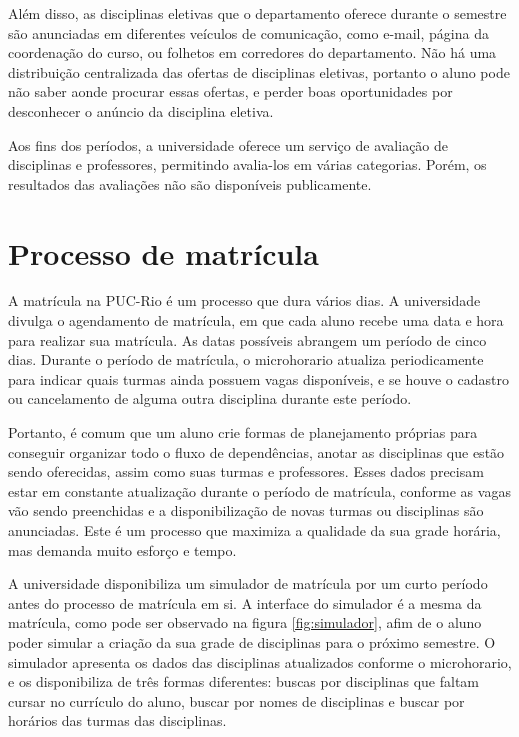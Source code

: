 Além disso, as disciplinas eletivas que o departamento oferece durante o semestre são anunciadas em diferentes veículos de comunicação, como e-mail, página da coordenação do curso, ou folhetos em corredores do departamento. Não há uma distribuição centralizada das ofertas de disciplinas eletivas, portanto o aluno pode não saber aonde procurar essas ofertas, e perder boas oportunidades por desconhecer o anúncio da disciplina eletiva.

Aos fins dos períodos, a universidade oferece um serviço de avaliação de disciplinas e professores, permitindo avalia-los em várias categorias. Porém, os resultados das avaliações não são disponíveis publicamente.

\section{Processo de matrícula}

A matrícula na PUC-Rio é um processo que dura vários dias. A universidade divulga o agendamento de matrícula, em que cada aluno recebe uma data e hora para realizar sua matrícula. As datas possíveis abrangem um período de cinco dias. Durante o período de matrícula, o microhorario atualiza periodicamente para indicar quais turmas ainda possuem vagas disponíveis, e se houve o cadastro ou cancelamento de alguma outra disciplina durante este período.

Portanto, é comum que um aluno crie formas de planejamento próprias para conseguir organizar todo o fluxo de dependências, anotar as disciplinas que estão sendo oferecidas, assim como suas turmas e professores. Esses dados precisam estar em constante atualização durante o período de matrícula, conforme as vagas vão sendo preenchidas e a disponibilização de novas turmas ou disciplinas são anunciadas. Este é um processo que maximiza a qualidade da sua grade horária, mas demanda muito esforço e tempo. 

A universidade disponibiliza um simulador de matrícula por um curto período antes do processo de matrícula em si. A interface do simulador é a mesma da matrícula, como pode ser observado na figura \ref{fig:simulador}, 
afim de o aluno poder simular a criação da sua grade de disciplinas para o próximo semestre. O simulador apresenta os dados das disciplinas atualizados conforme o microhorario, e os disponibiliza de três formas diferentes: buscas por disciplinas que faltam cursar no currículo do aluno, buscar por nomes de disciplinas e buscar por horários das turmas das 
disciplinas.\cite{doc-matricula}

